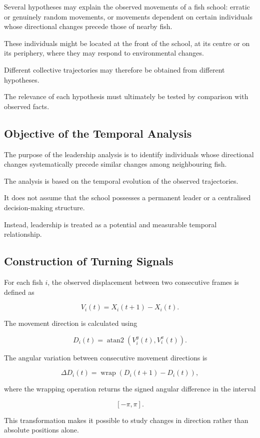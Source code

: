 \documentclass[10pt,a4paper]{article}
\begin{document}
Several hypotheses may explain
the observed movements of a fish school:
erratic or genuinely random movements,
or movements dependent on certain
individuals whose directional changes
precede those of nearby fish.

These individuals might be located
at the front of the school,
at its centre or on its periphery,
where they may respond to
environmental changes.

Different collective trajectories
may therefore be obtained
from different hypotheses.

The relevance of each hypothesis
must ultimately be tested
by comparison with observed facts.

\subsection{Objective of the Temporal Analysis}

The purpose of the leadership analysis
is to identify individuals whose
directional changes systematically
precede similar changes
among neighbouring fish.

The analysis is based on
the temporal evolution of
the observed trajectories.

It does not assume that
the school possesses a permanent
leader or a centralised
decision-making structure.

Instead, leadership is treated
as a potential and measurable
temporal relationship.

\subsection{Construction of Turning Signals}

For each fish $i$,
the observed displacement
between two consecutive frames
is defined as

\[
V_i(t)
=
X_i(t+1)-X_i(t).
\]

The movement direction
is calculated using

\[
D_i(t)
=
\operatorname{atan2}
\left(
V_i^y(t),V_i^x(t)
\right).
\]

The angular variation
between consecutive
movement directions is

\[
\Delta D_i(t)
=
\operatorname{wrap}
\left(
D_i(t+1)-D_i(t)
\right),
\]

where the wrapping operation
returns the signed angular
difference in the interval

\[
[-\pi,\pi].
\]

This transformation makes
it possible to study
changes in direction
rather than absolute
positions alone.
\end{document}
